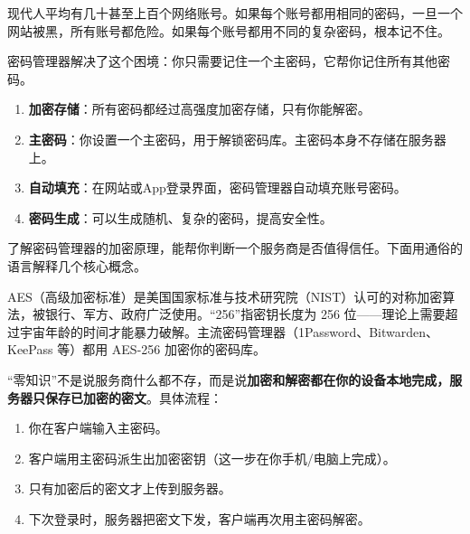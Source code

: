 


现代人平均有几十甚至上百个网络账号。如果每个账号都用相同的密码，一旦一个网站被黑，所有账号都危险。如果每个账号都用不同的复杂密码，根本记不住。

密码管理器解决了这个困境：你只需要记住一个主密码，它帮你记住所有其他密码。


\begin{enumerate}
  \item \textbf{加密存储}：所有密码都经过高强度加密存储，只有你能解密。
  \item \textbf{主密码}：你设置一个主密码，用于解锁密码库。主密码本身不存储在服务器上。
  \item \textbf{自动填充}：在网站或App登录界面，密码管理器自动填充账号密码。
  \item \textbf{密码生成}：可以生成随机、复杂的密码，提高安全性。
\end{enumerate}


了解密码管理器的加密原理，能帮你判断一个服务商是否值得信任。下面用通俗的语言解释几个核心概念。


AES（高级加密标准）是美国国家标准与技术研究院（NIST）认可的对称加密算法，被银行、军方、政府广泛使用。“256”指密钥长度为 256 位——理论上需要超过宇宙年龄的时间才能暴力破解。主流密码管理器（1Password、Bitwarden、KeePass 等）都用 AES-256 加密你的密码库。


“零知识”不是说服务商什么都不存，而是说\textbf{加密和解密都在你的设备本地完成，服务器只保存已加密的密文}。具体流程：

\begin{enumerate}
  \item 你在客户端输入主密码。
  \item 客户端用主密码派生出加密密钥（这一步在你手机/电脑上完成）。
  \item 只有加密后的密文才上传到服务器。
  \item 下次登录时，服务器把密文下发，客户端再次用主密码解密。
\end{enumerate}

